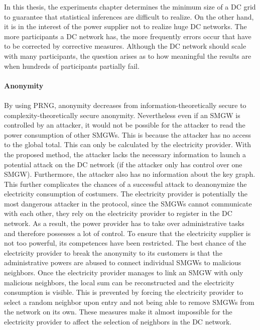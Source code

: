 In this thesis, the experiments chapter determines the minimum size of a DC grid to guarantee that statistical inferences are difficult to realize.
On the other hand, it is in the interest of the power supplier not to realize huge DC networks. The more participants a DC network has, the more frequently errors occur that have to be corrected by corrective measures. Although the DC network should scale with many participants, the question arises as to how meaningful the results are when hundreds of participants partially fail.%
\\
\\ 
\textbf{Anonymity}
\\
\\
By using PRNG, anonymity decreases from information-theoretically secure to complexity-theoretically secure anonymity. Nevertheless even if an SMGW is controlled by an attacker, it would not be possible for the attacker to read the power consumption of other SMGWs. This is because the attacker has no access to the global total. This can only be calculated by the electricity provider. With the proposed method, the attacker lacks the necessary information to launch a potential attack on the DC network (if the attacker only has control over one SMGW). Furthermore, the attacker also has no information about the key graph. This further complicates the chances of a successful attack to deanonymize the electricity consumption of costumers. The electricity provider is potentially the most dangerous attacker in the protocol, since the SMGWs cannot communicate with each other, they rely on the electricity provider to register in the DC network. As a result, the power provider has to take over administrative tasks and therefore possesses a lot of control. To ensure that the electricity supplier is not too powerful, its competences have been restricted. The best chance of the electricity provider to break the anonymity to its customers is that the administrative powers are abused to connect individual SMGWs to malicious neighbors. Once the electricity provider manages to link an SMGW with only malicious neighbors, the local sum can be reconstructed and the electricity consumption is visible. This is prevented by forcing the electricity provider to select a random neighbor upon entry and not being able to remove SMGWs from the network on its own. These measures make it almost impossible for the electricity provider to affect the selection of neighbors in the DC network.


\clearpage

